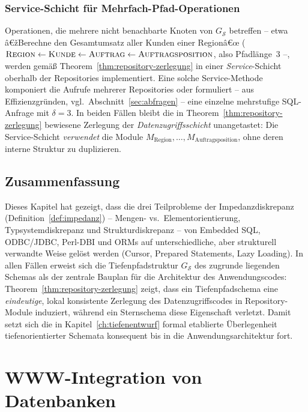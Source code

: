 ﻿\documentclass[a4paper,12pt]{report}
\theoremstyle{definition}
\theoremstyle{remark}
\begin{document}
\subsection{Service-Schicht für Mehrfach-Pfad-Operationen}

Operationen, die mehrere nicht benachbarte Knoten von
$G_{\mathcal{S}}$ betreffen -- etwa â€žBerechne den Gesamtumsatz aller
Kunden einer Regionâ€œ ($\textsc{Region}\leftarrow\textsc{Kunde}
\leftarrow\textsc{Auftrag}\leftarrow\textsc{Auftragsposition}$, also
Pfadlänge~3 --, werden gemäß Theorem~\ref{thm:repository-zerlegung}
in einer \emph{Service}-Schicht oberhalb der Repositories
implementiert. Eine solche Service-Methode komponiert die Aufrufe
mehrerer Repositories oder formuliert -- aus Effizienzgründen, vgl.\
Abschnitt~\ref{sec:abfragen} -- eine einzelne mehrstufige
SQL-Anfrage mit $\delta=3$. In beiden Fällen bleibt die in
Theorem~\ref{thm:repository-zerlegung} bewiesene Zerlegung der
\emph{Datenzugriffsschicht} unangetastet: Die Service-Schicht
\emph{verwendet} die Module $M_{\text{Region}},\ldots,
M_{\text{Auftragsposition}}$, ohne deren interne Struktur zu
duplizieren.

\section{Zusammenfassung}

Dieses Kapitel hat gezeigt, dass die drei Teilprobleme der
Impedanzdiskrepanz (Definition~\ref{def:impedanz}) -- Mengen- vs.\
Elementorientierung, Typsystemdiskrepanz und Strukturdiskrepanz -- von
Embedded SQL, ODBC/JDBC, Perl-DBI und ORMs auf unterschiedliche, aber
strukturell verwandte Weise gelöst werden (Cursor, Prepared
Statements, Lazy Loading). In allen Fällen erweist sich die
Tiefenpfadstruktur $G_{\mathcal{S}}$ des zugrunde liegenden Schemas als
der zentrale Bauplan für die Architektur des Anwendungscodes:
Theorem~\ref{thm:repository-zerlegung} zeigt, dass ein Tiefenpfadschema
eine \emph{eindeutige}, lokal konsistente Zerlegung des
Datenzugriffscodes in Repository-Module induziert, während ein
Sternschema diese Eigenschaft verletzt. Damit setzt sich die in
Kapitel~\ref{ch:tiefenentwurf} formal etablierte Überlegenheit
tiefenorientierter Schemata konsequent bis in die
Anwendungsarchitektur fort.

\chapter{WWW-Integration von Datenbanken}
\label{ch:www}
\end{document}
